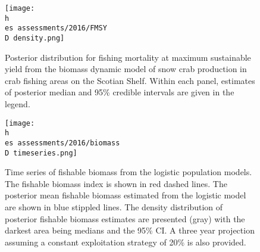 \documentclass[11pt]{article}
\newcommand{\D}{.}
\newcommand{\h}{\string~}
\newcommand{\es}{bio.data/bio.snowcrab/}
\begin{document}
\begin{figure}
    
    \texttt{[image: \\h \\es assessments/2016/FMSY\\D density.png]}
    \caption{Posterior distribution for fishing mortality at maximum sustainable yield from the biomass dynamic model of snow crab production in crab fishing areas on the Scotian Shelf. Within each panel, estimates of posterior median and 95\% credible intervals are given in the legend.}
  
\end{figure}
\clearpage



\begin{figure}
\centering
\texttt{[image: \\h \\es assessments/2016/biomass\\D timeseries.png]}\\ 
\caption{Time series of fishable biomass from the logistic population models. The fishable biomass index is shown in red dashed lines. The posterior mean fishable biomass estimated from the logistic model are shown in blue stippled lines. The density distribution of posterior fishable biomass estimates are presented (gray) with the darkest area being medians and the 95\% CI. A three year projection assuming a constant exploitation strategy of 20\% is also provided.}
\end{figure}
\clearpage
%
%
%
%
%
%
\end{document}
